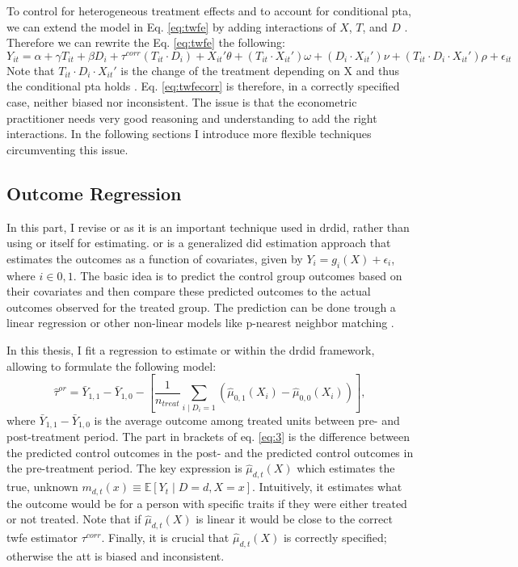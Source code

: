 To control for heterogeneous treatment effects and to account for conditional \ac{pta}, we can extend the model in Eq. \ref{eq:twfe} by adding interactions of $X$, $T$, and $D$ \citep[see][]{manfeDifferenceInDifferenceDesignRepeated, hansen2022econometrics}.
Therefore we can rewrite the Eq. \ref{eq:twfe} the following:
\begin{equation}
    Y_{it} = \alpha + \gamma T_{it} + \beta D_{i} + \tau^{corr} (T_{it} \cdot D_{i}) + X_{it}' \theta + (T_{it} \cdot X_{it}') \omega + (D_{i} \cdot X_{it}') \nu + (T_{it} \cdot D_{i} \cdot X_{it}') \rho + \epsilon_{it}
    \label{eq:twfecorr}
\end{equation}
Note that $T_{it} \cdot D_{i} \cdot X_{it}'$ is the change of the treatment depending on X and thus the conditional \ac{pta} holds \citep{manfeDifferenceInDifferenceDesignRepeated}.
Eq. \ref{eq:twfecorr} is therefore, in a correctly specified case, neither biased nor inconsistent.
The issue is that the econometric practitioner needs very good reasoning and understanding to add the right interactions.
In the following sections I introduce more flexible techniques circumventing this issue.

\subsection{Outcome Regression}
In this part, I revise \ac{or} as it is an important technique used in \ac{drdid}, rather than using \ac{or} itself for estimating.
\ac{or} is a generalized \ac{did} estimation approach that estimates the outcomes as a function of covariates, given by $Y_i = g_i(X) + \epsilon_i$, where $i \in 0,1$.
The basic idea is to predict the control group outcomes based on their covariates and then compare these predicted outcomes to the actual outcomes observed for the treated group.
The prediction can be done trough a linear regression or other non-linear models like p-nearest neighbor matching \parencite{heckmanMatchingEconometricEvaluation1998}.

In this thesis, I fit a regression to estimate \ac{or} within the \ac{drdid} framework, allowing to formulate the following model:
\begin{equation}
\hat{\tau}^{or} = \bar{Y}_{1,1} - \bar{Y}_{1,0} - \left[ \frac{1}{n_{treat}} \sum_{i \mid D_i = 1} \left( \hat{\mu}_{0,1}(X_i) - \hat{\mu}_{0,0}(X_i) \right) \right],
\label{eq:3}
\end{equation}
where $\bar{Y}_{1,1} - \bar{Y}_{1,0}$ is the average outcome among treated units between pre- and post-treatment period.
The part in brackets of eq. \ref{eq:3} is the difference between the predicted control outcomes in the post- and the predicted control outcomes in the pre-treatment period.
The key expression is $\hat{\mu}_{d,t}(X)$ which estimates the true, unknown $m_{d,t}(x) \equiv \mathbb{E}[Y_t \mid D = d, X = x]$.
Intuitively, it estimates what the outcome would be for a person with specific traits if they were either treated or not treated.
Note that if $\hat{\mu}_{d,t}(X)$ is linear it would be close to the correct \ac{twfe} estimator $\tau^{corr}$.
Finally, it is crucial that $\hat{\mu}_{d,t}(X)$ is correctly specified; otherwise the \ac{att} is biased and inconsistent.

